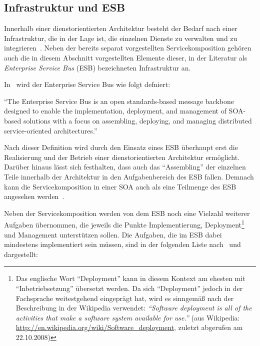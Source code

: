 
\subsection{Infrastruktur und ESB} %
\label{sub:infrastruktur}

  Innerhalb einer dienstorientierten Architektur besteht der Bedarf nach einer Infrastruktur, die in der Lage ist, die einzelnen Dienste zu verwalten und zu integrieren~\citep[S. 270]{web_services_principles_and_technology}. Neben der bereits separat vorgestellten Servicekomposition gehören auch die in diesem Abschnitt vorgestellten Elemente dieser, in der Literatur als \emph{Enterprise Service Bus} (ESB) bezeichneten Infrastruktur an.
  
  In~\citep{web_services_principles_and_technology} wird der Enterprise Service Bus wie folgt defniert:
  
  \begin{definition}[ESB]\label{def:enterprise_serivce_bus}
    "`The Enterprise Service Bus is an open standards-based message backbone designed to enable the implementation, deployment, and management of SOA-based solutions with a focus on assembling, deploying, and managing distributed service-oriented architectures."'~\emph{\citep[S. 270]{web_services_principles_and_technology}}
  \end{definition}
  
  Nach dieser Definition wird durch den Einsatz eines ESB überhaupt erst die Realisierung und der Betrieb einer dienstorientierten Architektur ermöglicht. Darüber hinaus lässt sich festhalten, dass auch das "`Assembling"' der einzelnen Teile innerhalb der Architektur in den Aufgabenbereich des ESB fallen. Demnach kann die Servicekomposition in einer SOA auch als eine Teilmenge des ESB angesehen werden~\citep[S. 3]{enterprise_service_bus}.

  Neben der Servicekomposition werden von dem ESB noch eine Vielzahl weiterer Aufgaben übernommen, die jeweils die Punkte Implementierung, Deployment\footnote{Das englische Wort "`Deployment"' kann in diesem Kontext am ehesten mit "`Inbetriebsetzung"' übersetzt werden. Da sich "`Deployment"' jedoch in der Fachsprache weitestgehend eingeprägt hat, wird es sinngemäß nach der Beschreibung in der Wikipedia verwendet: \emph{"`Software deployment is all of the activities that make a software system available for use."'} (aus Wikipedia: \url{http://en.wikipedia.org/wiki/Software_deployment}, zuletzt abgerufen am 22.10.2008)} und Management unterstützen sollen. Die Aufgaben, die im ESB dabei mindestens implementiert sein müssen, sind in der folgenden Liste nach~\citep[S. 137]{soa_goes_real} und~\citep[S. 146]{masak2007ssb} dargestellt:
  
